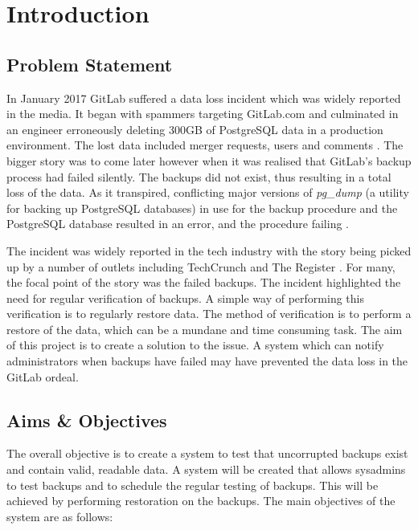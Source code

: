 \section{Introduction}

\subsection{Problem Statement}
In January 2017 GitLab suffered a data loss incident which was widely reported in the media. It began with spammers targeting GitLab.com and culminated in an engineer erroneously deleting 300GB of PostgreSQL data in a production environment. The lost data included merger requests, users and comments \citep{gitlab1}. The bigger story was to come later however when it was realised that GitLab's backup process had failed silently. The backups did not exist, thus resulting in a total loss of the data. As it transpired, conflicting major versions of \textit{pg\_dump} (a utility for backing up PostgreSQL databases) in use for the backup procedure and the PostgreSQL database resulted in an error, and the procedure failing \citep{gitlab2}.

The incident was widely reported in the tech industry with the story being picked up by a number of outlets including TechCrunch \citeyearpar{lomas} and The Register \citeyearpar{sharwood}. For many, the focal point of the story was the failed backups. The incident highlighted the need for regular verification of backups. A simple way of performing this verification is to regularly restore data. The method of verification is to perform a restore of the data, which can be a mundane and time consuming task. The aim of this project is to create a solution to the issue. A system which can notify administrators when backups have failed may have prevented the data loss in the GitLab ordeal.

\subsection{Aims \& Objectives}
The overall objective is to create a system to test that uncorrupted backups exist and contain valid, readable data. A system will be created that allows sysadmins to test backups and to schedule the regular testing of backups. This will be achieved by performing restoration on the backups. The main objectives of the system are as follows:

